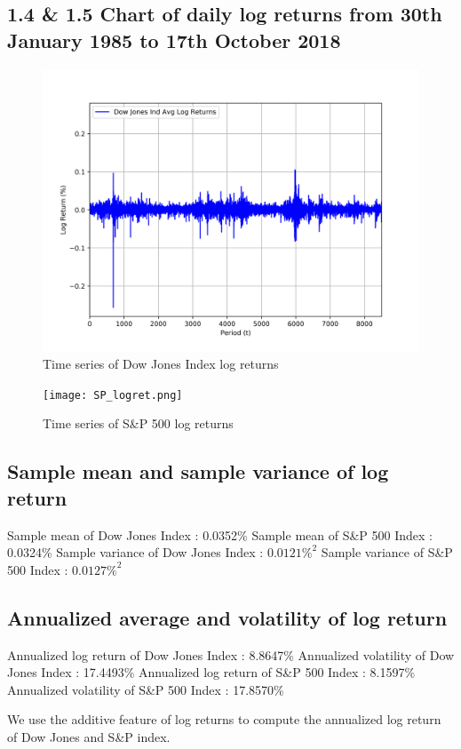 \documentclass[a4paper]{article}
\begin{document}
	\newpage
	\subsection*{1.4 \& 1.5 \quad Chart of daily log returns from 30th January 1985 to 17th October 2018}
	
	\begin{figure}[h!]
		\centering
		\includegraphics[width=0.8\linewidth]{DJI_logret.png}
		\caption{Time series of Dow Jones Index log returns}
	\end{figure}
	\begin{figure}[h!]
		\centering
		\texttt{[image: SP\_logret.png]}
		\caption{Time series of S\&P 500 log returns}
	\end{figure}
	
	\setcounter{subsection}{5}
	\subsection{Sample mean and sample variance of log return}
	
	\begin{flushleft}
		Sample mean of Dow Jones Index : 0.0352\%  \linebreak 
		Sample mean of S\&P 500 Index : 0.0324\%  \linebreak 
		Sample variance of Dow Jones Index : $0.0121\%^2$  \linebreak 
		Sample variance of S\&P 500 Index : $0.0127\%^2$ \linebreak 
	\end{flushleft}
	
	\subsection{Annualized average and volatility of log return}
	\begin{flushleft}
		Annualized log return of Dow Jones Index : 8.8647\% \linebreak 
		Annualized volatility of Dow Jones Index : 17.4493\% \linebreak 
		Annualized log return of S\&P 500 Index : 8.1597\% \linebreak 
		Annualized volatility of S\&P 500 Index : 17.8570\% \linebreak 
	\end{flushleft}
	\vspace{-7mm}
	We use the additive feature of log returns to compute the annualized log return of Dow Jones and S\&P index. 
	
\end{document}

